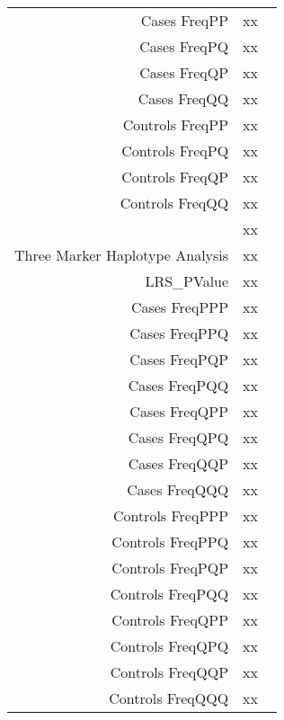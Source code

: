 \begin{supertabular}{r p{5in}}
    Cases FreqPP  & xx  \\
    Cases FreqPQ  & xx  \\
    Cases FreqQP  & xx  \\
    Cases FreqQQ  & xx  \\
    Controls FreqPP  & xx  \\
    Controls FreqPQ  & xx  \\
    Controls FreqQP  & xx  \\
    Controls FreqQQ  & xx  \\
  ~ & xx ~ \\
  Three Marker Haplotype Analysis & xx ~ \\
    LRS\_PValue  & xx  \\
    Cases FreqPPP  & xx  \\
    Cases FreqPPQ  & xx  \\
    Cases FreqPQP  & xx  \\
    Cases FreqPQQ  & xx  \\
    Cases FreqQPP  & xx  \\
    Cases FreqQPQ  & xx  \\
    Cases FreqQQP  & xx  \\
    Cases FreqQQQ  & xx  \\
    Controls FreqPPP  & xx  \\
    Controls FreqPPQ  & xx  \\
    Controls FreqPQP  & xx  \\
    Controls FreqPQQ  & xx  \\
    Controls FreqQPP  & xx  \\
    Controls FreqQPQ  & xx  \\
    Controls FreqQQP  & xx  \\
    Controls FreqQQQ  & xx  \\
\end{supertabular} 
